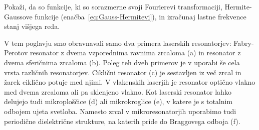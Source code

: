 \begin{definition}
Pokaži, da so funkcije, ki so sorazmerne svoji Fourierevi transformaciji, 
Hermite-Gaussove funkcije (enačba~\ref{eq:Gauss-Hermitevi}), in 
izračunaj lastne frekvence stanj višjega reda.
\end{definition}

\begin{remark}
V tem poglavju smo obravnavali samo dva primera laserskih resonatorjev: Fabry-Perotov
resonator z dvema vzporednima ravnima zrcaloma (a) in resonator z dvema sferičnima zrcaloma (b).
Poleg teh dveh primerov je v uporabi še cela vrsta različnih resonatorjev. Ciklični
resonator (c) je
sestavljen iz več zrcal in žarek ciklično potuje med njimi. V vlakenskih laserjih je resonator
optično vlakno med dvema zrcaloma ali pa sklenjeno vlakno. 
Kot laserski resonator lahko delujejo tudi mikroploščice (d) ali mikrokroglice (e), 
v katere je s totalnim odbojem ujeta svetloba. 
Namesto zrcal v mikroresonatorjih uporabimo tudi periodične dielektrične strukture, na katerih 
pride do Braggovega odboja (f).
\end{remark}

\begin{figure}[h]
\centering
\def\svgwidth{140truemm} 

\label{fig:resonatorji}
\end{figure}

